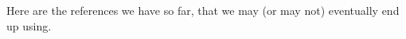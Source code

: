 \documentclass{article}
\begin{document}
\noindent
Here are the references we have so far, that we may (or may not) eventually end up using.

\nocite{*}


\end{document}
